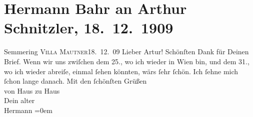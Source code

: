

         
         \renewcommand{\erwaehntePersonen}{Personen: Hermann Bahr}
         \renewcommand{\erwaehnteOrte}{Orte: Semmering, Villa Mauthner-Markhof, Wien}
         \renewcommand{\erwaehnteWerke}{}
               \section[Hermann Bahr an Arthur Schnitzler, 18. 12. 1909]{ Hermann Bahr an Arthur Schnitzler, 18. 12. 1909}\nopagebreak{}\rehead{ }\begin{ledgroupsized}[t]{13cm}\normalsize\beginnumbering \toendnotes[C]{\smallbreak\pagebreak[2]} 
\pstart
           \raggedleft{}{\pb}Semmering \textsc{Villa Mautner}18. 12. 09\pend
           \pstart\center{}Lieber Artur!\pend\pstart
           Schönſten Dank für Deinen Brief. Wenn wir uns zwiſchen dem 25., wo ich wieder in Wien bin, und dem 31., wo ich wieder abreiſe,
               einmal ſehen könnten, wärs ſehr ſchön. Ich ſehne mich ſchon lange danach.\pend
           \pstart
           Mit den ſchönſten Grüßen{\\[\baselineskip]}von Haus zu Haus{\\[\baselineskip]}Dein alter{\\[\baselineskip]}\spacefill\mbox{Hermann}\pend
           \leftskip=0em{}
         
         \endnumbering{}\end{ledgroupsized}  \newcommand{\dateiname}{L01906}\newcommand{\titel}{Hermann Bahr an Arthur Schnitzler, 18. 12. 1909}\newcommand{\editorInnen}{ Kurt Ifkovits,  Martin Anton Müller}
      